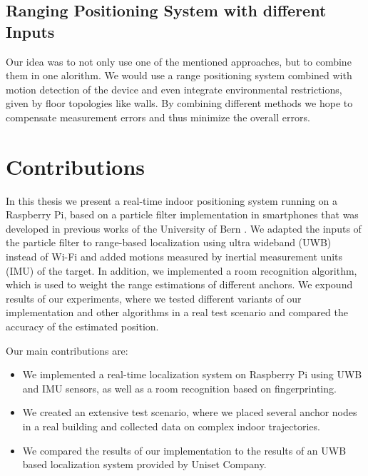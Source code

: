 \subsection{Ranging Positioning System with different Inputs}

Our idea was to not only use one of the mentioned approaches, but to combine them in one alorithm. We would use a range positioning system combined with motion detection of the device and even integrate environmental restrictions, given by floor topologies like walls. By combining different methods we hope to compensate measurement errors and thus minimize the overall errors.



\section{Contributions}

In this thesis we present a real-time indoor positioning system running on a Raspberry Pi, based on a particle filter implementation in smartphones that was developed in previous works of the University of Bern \cite{Carrera}. We adapted the inputs of the particle filter to range-based localization using ultra wideband (UWB) instead of Wi-Fi and added motions measured by inertial measurement units (IMU) of the target. In addition, we implemented a room recognition algorithm, which is used to weight the range estimations of different anchors.
We expound results of our experiments, where we tested different variants of our implementation and other algorithms in a real test scenario and compared the accuracy of the estimated position.

Our main contributions are:
\begin{itemize}
\item We implemented a real-time localization system on Raspberry Pi using UWB and IMU sensors, as well as a room recognition based on fingerprinting. 
\item We created an extensive test scenario, where we placed several anchor nodes in a real building and collected data on complex indoor trajectories. 
\item We compared the results of our implementation to the results of an UWB based localization system provided by Uniset Company.
\end{itemize}



